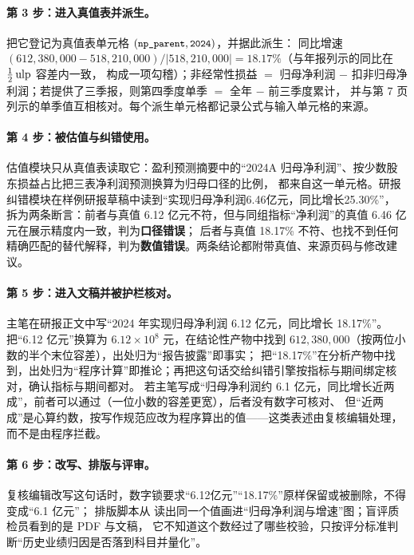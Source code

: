 \paragraph{第 3 步：进入真值表并派生。}
 把它登记为真值表单元格 $(\texttt{\small np\_parent}, \texttt{\small 2024})$，并据此派生：
同比增速 $(612{,}380{,}000-518{,}210{,}000)/|518{,}210{,}000| = 18.17\%$（与年报列示的同比在 $\tfrac12\operatorname{ulp}$ 容差内一致，
构成一项勾稽）；非经常性损益 $=$ 归母净利润 $-$ 扣非归母净利润；若提供了三季报，则第四季度单季 $=$ 全年 $-$ 前三季度累计，
并与第 7 页列示的单季值互相核对。每个派生单元格都记录公式与输入单元格的来源。

\paragraph{第 4 步：被估值与纠错使用。}
估值模块只从真值表读取它：盈利预测摘要中的“2024A 归母净利润”、按少数股东损益占比把三表净利润预测换算为归母口径的比例，
都来自这一单元格。研报纠错模块在样例研报草稿中读到“实现归母净利润6.46亿元，同比增长25.30\%”，
拆为两条断言：前者与真值 6.12 亿元不符，但与同组指标“净利润”的真值 6.46 亿元在展示精度内一致，判为\textbf{口径错误}；
后者与真值 18.17\% 不符、也找不到任何精确匹配的替代解释，判为\textbf{数值错误}。两条结论都附带真值、来源页码与修改建议。

\paragraph{第 5 步：进入文稿并被护栏核对。}
主笔在研报正文中写“2024 年实现归母净利润 6.12 亿元，同比增长 18.17\%”。 把“6.12 亿元”换算为
$6.12\times10^8$ 元，在结论性产物中找到 $612{,}380{,}000$（按两位小数的半个末位容差），出处归为“报告披露”即事实；
把“18.17\%”在分析产物中找到，出处归为“程序计算”即推论；再把这句话交给纠错引擎按指标与期间绑定核对，确认指标与期间都对。
若主笔写成“归母净利润约 6.1 亿元，同比增长近两成”，前者可以通过（一位小数的容差更宽），后者没有数字可核对、
但“近两成”是心算约数，按写作规范应改为程序算出的值——这类表述由复核编辑处理，而不是由程序拦截。

\paragraph{第 6 步：改写、排版与评审。}
复核编辑改写这句话时，数字锁要求“6.12亿元”“18.17\%”原样保留或被删除，不得变成“6.1 亿元”；
排版脚本从  读出同一个值画进“归母净利润与增速”图；盲评质检员看到的是 PDF 与文稿，
它不知道这个数经过了哪些校验，只按评分标准判断“历史业绩归因是否落到科目并量化”。


